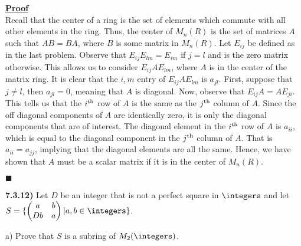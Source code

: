 \documentclass[12pt,a4paper]{article}
\newcommand{\prob}[2]{\textbf{#1)} #2}
\newenvironment{proof}
{
\textbf{\underline{Proof}} \\
}
{
\begin{flushright}
$\blacksquare$
\end{flushright}}
\begin{document}
\begin{proof}
    Recall that the center of a ring is the set of elements which commute with all other elements in the ring.
    Thus, the center of $M_{n}(R)$ is the set of matrices $A$ such that $AB = BA$, where $B$ is some matrix in $M_{n}(R)$.
    Let $E_{ij}$ be defined as in the last problem.
    Observe that $E_{ij}E_{lm} = E_{im}$ if $j=l$ and is the zero matrix otherwise. 
    This allows us to consider $E_{ij}AE_{lm}$, where $A$ is in the center of the matrix ring.
    It is clear that the $i,m$ entry of $E_{ij}AE_{lm}$ is $a_{jl}$.
    First, suppose that $j \ne l$, then $a_{jl} = 0$, meaning that $A$ is diagonal.
    Now, observe that $E_{ij}A = AE_{ji}$. This tells us that the $i^{\rm th}$ row of $A$ is the same as the $j^{\rm th}$ column of $A$.
    Since the off diagonal components of $A$ are identically zero, it is only the diagonal components that are of interest.
    The diagonal element in the $i^{\rm th}$ row of $A$ is $a_{ii}$, which is equal to the diagonal component in the $j^{\rm th}$ column of $A$.
    That is $a_{ii} = a_{jj}$, implying that the diagonal elements are all the same.
    Hence, we have shown that $A$ must be a scalar matrix if it is in the center of $M_{n}(R)$.
\end{proof}

\prob{7.3.12}{
Let $D$ be an integer that is not a perfect square in $\integers$ and let $S = \{ \begin{pmatrix}
        a & b \\
        Db & a
\end{pmatrix} | a,b \in \integers \} $.
}

a) Prove that $S$ is a subring of $M_2(\integers)$.
\end{document}
